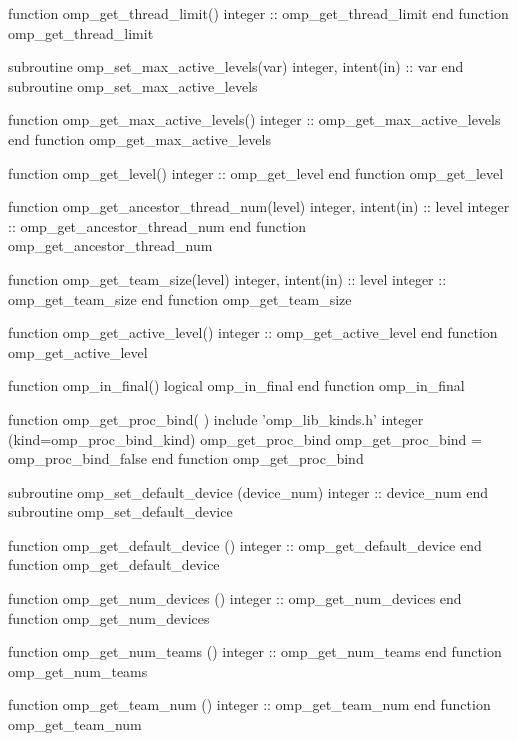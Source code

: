 {\begin{codepar}
          function omp\_get\_thread\_limit()
           integer :: omp\_get\_thread\_limit
          end function omp\_get\_thread\_limit

          subroutine omp\_set\_max\_active\_levels(var)
           integer, intent(in) :: var
          end subroutine omp\_set\_max\_active\_levels

          function omp\_get\_max\_active\_levels()
           integer :: omp\_get\_max\_active\_levels
          end function omp\_get\_max\_active\_levels

          function omp\_get\_level()
           integer :: omp\_get\_level
          end function omp\_get\_level

          function omp\_get\_ancestor\_thread\_num(level)
           integer, intent(in) :: level
           integer :: omp\_get\_ancestor\_thread\_num
          end function omp\_get\_ancestor\_thread\_num

          function omp\_get\_team\_size(level)
           integer, intent(in) :: level
           integer :: omp\_get\_team\_size
          end function omp\_get\_team\_size

          function omp\_get\_active\_level()
           integer :: omp\_get\_active\_level
          end function omp\_get\_active\_level

          function omp\_in\_final()
           logical omp\_in\_final
          end function omp\_in\_final

          function omp\_get\_proc\_bind( )
           include 'omp\_lib\_kinds.h'
           integer (kind=omp\_proc\_bind\_kind) omp\_get\_proc\_bind
           omp\_get\_proc\_bind = omp\_proc\_bind\_false
          end function omp\_get\_proc\_bind

          subroutine omp\_set\_default\_device (device\_num)
           integer :: device\_num
          end subroutine omp\_set\_default\_device

          function omp\_get\_default\_device ()
           integer :: omp\_get\_default\_device
          end function omp\_get\_default\_device

          function omp\_get\_num\_devices ()
           integer :: omp\_get\_num\_devices
          end function omp\_get\_num\_devices

          function omp\_get\_num\_teams ()
           integer :: omp\_get\_num\_teams
          end function omp\_get\_num\_teams

          function omp\_get\_team\_num ()
           integer :: omp\_get\_team\_num
          end function omp\_get\_team\_num


\end{codepar}}
